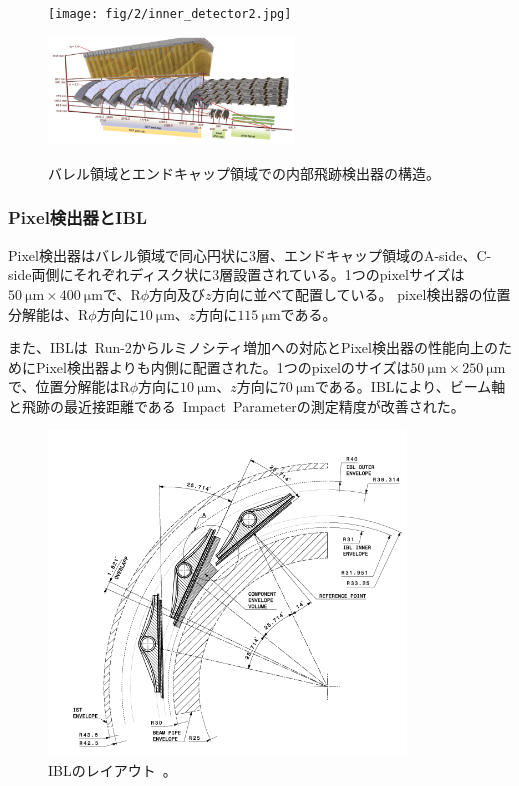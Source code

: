 \begin{figure}[h]
  \begin{minipage}[b]{0.48\linewidth}
      \centering
      \texttt{[image: fig/2/inner\_detector2.jpg]}
      \label{fig:2-8-1}
  \end{minipage}
    \begin{minipage}[b]{0.48\linewidth}
      \centering
      \includegraphics[clip, width=6.5cm]{fig/2/inner_detector3.png}
      \label{fig:2-8-2}
  \end{minipage}
  \caption{バレル領域とエンドキャップ領域での内部飛跡検出器の構造\cite{Aad:1129811}。}
\end{figure}

\subsubsection{Pixel検出器とIBL}
Pixel検出器はバレル領域で同心円状に3層、エンドキャップ領域のA-side、C-side両側にそれぞれディスク状に3層設置されている。1つのpixelサイズは$\SI{50}{\um} \times \SI{400}{\um}$で、R$\phi$方向及び$z$方向に並べて配置している。
pixel検出器の位置分解能は、R$\phi$方向に$\SI{10}{\um}$、$z$方向に$\SI{115}{\um}$である。

また、IBLは~Run-2からルミノシティ増加への対応とPixel検出器の性能向上のためにPixel検出器よりも内側に配置された。1つのpixelのサイズは$\SI{50}{\um} \times \SI{250}{\um}$で、位置分解能はR$\phi$方向に$\SI{10}{\um}$、$z$方向に$\SI{70}{\um}$である。IBLにより、ビーム軸と飛跡の最近接距離である~Impact~Parameterの測定精度が改善された。

\begin{figure}[h]
  \centering
  \includegraphics[clip, width=9.5cm]{fig/2/IBL_layout.png}
  \caption{IBLのレイアウト~\cite{article:ATLASBlayerTDR}。}
  \label{fig:2-9}
\end{figure}

